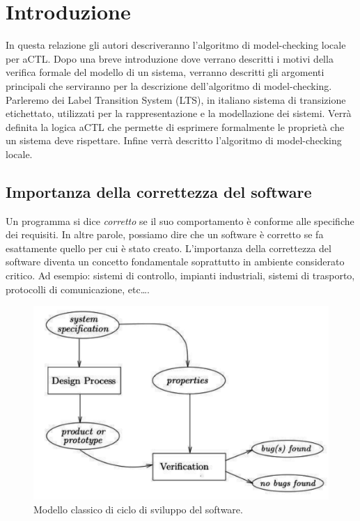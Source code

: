 \section{Introduzione}
In questa relazione gli autori descriveranno l'algoritmo di model-checking locale per aCTL. Dopo una breve introduzione dove verrano descritti i motivi della verifica formale del modello di un sistema, verranno descritti gli argomenti principali che serviranno per la descrizione dell'algoritmo di model-checking. Parleremo dei Label Transition System (LTS), in italiano sistema di transizione etichettato, utilizzati per la rappresentazione e la modellazione dei sistemi. Verrà definita la logica aCTL che permette di esprimere formalmente le proprietà che un sistema deve rispettare.
Infine verrà descritto l'algoritmo di model-checking locale. 
\\


\subsection{Importanza della correttezza del software}
Un programma si dice \emph{corretto} se il suo comportamento è conforme alle specifiche dei requisiti. In altre parole, possiamo dire che un software è corretto se fa esattamente quello per cui è stato creato.
L'importanza della correttezza del software diventa un concetto fondamentale soprattutto in ambiente considerato critico. Ad esempio: sistemi di controllo, impianti industriali, sistemi di trasporto, protocolli di comunicazione, etc\dots.

\begin{figure}[ht]
\begin{center}
\includegraphics[scale=0.45]{img/Modello1.png}
\caption{Modello classico di ciclo di sviluppo del software.}
\label{fig:modello}
\end{center}
\end{figure}

